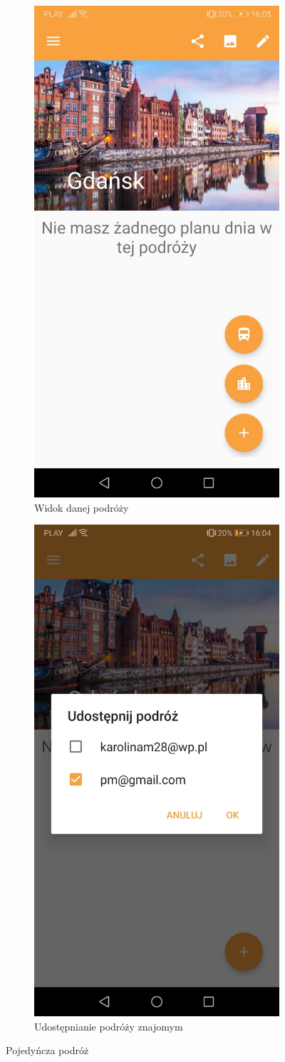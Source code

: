 \documentclass[10pt,twoside,a4paper]{report}
\begin{document}
\begin{figure}[h]
\centering
\begin{subfigure}{0.4\textwidth}
\centering
\includegraphics[width=0.9\linewidth, width=5cm]{newTravel}
\caption{Widok danej podróży}
\label{fig:newTravel}
\end{subfigure}
\begin{subfigure}{0.4\textwidth}
\centering
\includegraphics[width=0.9\linewidth, width=5cm]{shareTravelDialog}
\caption{Udostępnianie podróży znajomym}
\label{fig:shareTravelDialog}
\end{subfigure}
\caption{Pojedyńcza podróż}
\label{fig:podrecznik4}
\end{figure}
\end{document}

